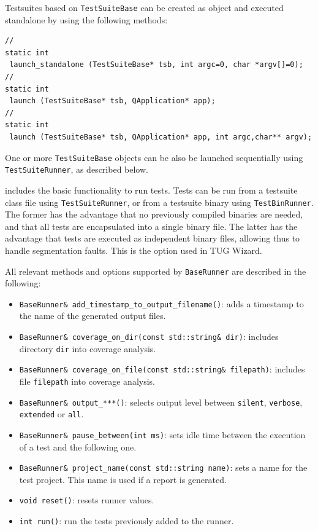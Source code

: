 Testsuites based on {\tt TestSuiteBase} can be created as object and
executed standalone by using the following methods:

\begin{lstlisting}
//
static int 
 launch_standalone (TestSuiteBase* tsb, int argc=0, char *argv[]=0);
//
static int 
 launch (TestSuiteBase* tsb, QApplication* app);
//
static int 
 launch (TestSuiteBase* tsb, QApplication* app, int argc,char** argv);
\end{lstlisting}


One or more {\tt TestSuiteBase} objects can be also be launched
sequentially using {\tt TestSuiteRunner}, as described below.


\newpage

 includes the basic functionality to run tests. Tests
can be run from a testsuite class file using {\tt TestSuiteRunner}, or
from a testsuite binary using {\tt TestBinRunner}. 
%
The former has the advantage that no previously compiled binaries are
needed, and that all tests are encapsulated into a single binary file.
%
The latter has the advantage that tests are executed as independent
binary files, allowing thus to handle segmentation faults. This is the
option used in TUG Wizard.

All relevant methods and options supported by {\tt BaseRunner} are
described in the following:
\begin{itemize}
%
\item {\tt BaseRunner\& add\_timestamp\_to\_output\_filename()}: adds a
  timestamp to the name of the generated output files.
%
\item {\tt BaseRunner\& coverage\_on\_dir(const std::string\& dir)}:
  includes directory {\tt dir} into coverage analysis.
%
\item {\tt BaseRunner\& coverage\_on\_file(const std::string\&
  filepath)}: includes file {\tt filepath} into coverage analysis.
%
\item {\tt BaseRunner\& output\_***()}: selects output level between
  {\tt silent}, {\tt verbose}, {\tt extended} or {\tt all}.
%
\item {\tt BaseRunner\& pause\_between(int ms)}: sets idle time
  between the execution of a test and the following one.
%
\item {\tt BaseRunner\& project\_name(const std::string name)}: sets a
  name for the test project. This name is used if a report is
  generated.
%
\item {\tt void reset()}: resets runner values.
%
\item {\tt int run()}: run the tests previously added to the runner.
%
\end{itemize}


